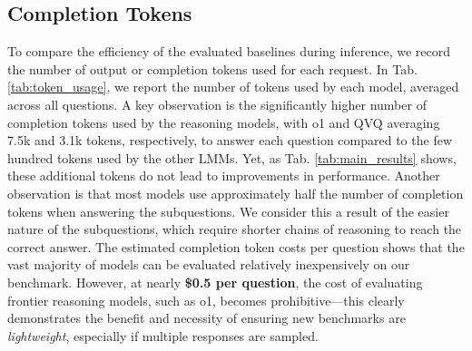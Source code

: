 \subsection{Completion Tokens}
To compare the efficiency of the evaluated baselines during inference, we record 
the number of output or completion tokens used for each request. In Tab. \ref{tab:token_usage}, we report the number of tokens used by each model, averaged across all questions. A key observation is the significantly higher number of completion tokens used by the reasoning models, with o1 and QVQ averaging  7.5k and 3.1k tokens, respectively, to answer each question compared to the few hundred tokens used by the other LMMs. Yet, as Tab. \ref{tab:main_results} shows, these additional tokens do not lead to improvements in performance. Another observation is that most models use approximately half the number of completion tokens when answering the subquestions. We consider this a result of the easier nature of the subquestions, which require shorter chains of reasoning to reach the correct answer. The estimated completion token costs per \benchmarkName question shows that the vast majority of models can be evaluated relatively inexpensively on our benchmark. However, at nearly \textbf{\$0.5 per question}, the cost of evaluating frontier reasoning models, such as o1, becomes prohibitive---this clearly demonstrates the benefit and necessity of ensuring new benchmarks are \textit{lightweight}, especially if multiple responses are sampled.







